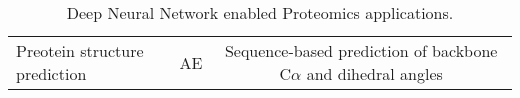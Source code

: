 \begin{table}[h!]
\centering
\begin{tabular}{||l|c|c|}
    \hline
    Preotein structure prediction & AE & Sequence-based prediction of backbone C$\alpha$ and dihedral angles 
    \hline
\end{tabular}
\caption{Deep Neural Network enabled Proteomics applications.}
\label{tab:PS-DNN}
\end{table}